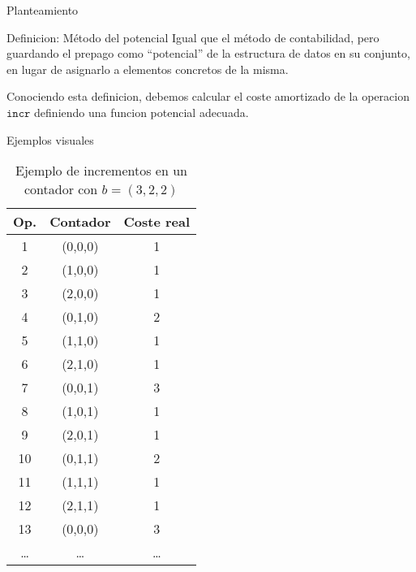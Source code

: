 \documentclass[aspectratio=169]{beamer}
\begin{document}
\begin{frame}{Planteamiento}
    \begin{exampleblock}{Definicion: Método del potencial}
        Igual que el método de contabilidad, pero guardando el prepago como “potencial” de la estructura de datos en su conjunto, en lugar de asignarlo a elementos concretos de la misma.

    \end{exampleblock}
    Conociendo esta definicion, debemos calcular el coste amortizado de la operacion $\texttt{incr}$ definiendo una funcion potencial adecuada.\\
\end{frame}

\begin{frame}{Ejemplos visuales}
    \begin{table}
        \centering
    {\footnotesize
        \begin{tabular}{|c|c|c|}
            \hline
            	\textbf{Op.} & \textbf{Contador} & \textbf{Coste real} \\
            \hline
            1 & (0,0,0) & 1 \\
            2 & (1,0,0) & 1 \\
            3 & (2,0,0) & 1 \\
            4 & (0,1,0) & 2 \\
            5 & (1,1,0) & 1 \\
            6 & (2,1,0) & 1 \\
            7 & (0,0,1) & 3 \\
            8 & (1,0,1) & 1 \\
            9 & (2,0,1) & 1 \\
            10 & (0,1,1) & 2 \\
            11 & (1,1,1) & 1 \\
            12 & (2,1,1) & 1 \\
            13 & (0,0,0) & 3 \\
            \ldots & \ldots & \ldots \\
            \hline
        \end{tabular}
        }
        \caption{Ejemplo de incrementos en un contador con $b = (3,2,2)$}
    \end{table}
\end{frame}
\end{document}
